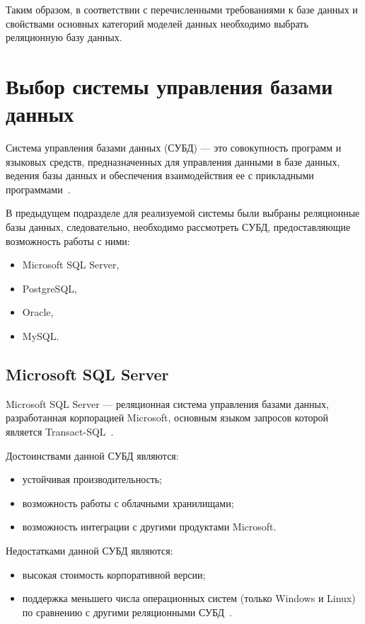 Таким образом, в соответствии с перечисленными требованиями к базе данных и
свойствами основных категорий моделей данных необходимо выбрать реляционную
базу данных.

\section{Выбор системы управления базами данных}

Система управления базами данных (СУБД) --- это совокупность программ и языковых
средств, предназначенных для управления данными в базе данных, ведения базы
данных и обеспечения взаимодействия ее с прикладными программами~\cite{gost01}.

В предыдущем подразделе для реализуемой системы были выбраны реляционные
базы данных, следовательно, необходимо рассмотреть СУБД, предоставляющие
возможность работы с ними:
\begin{itemize}
    \item Microsoft SQL Server,
    \item PostgreSQL,
    \item Oracle,
    \item MySQL.
\end{itemize}

\subsection{Microsoft SQL Server}

Microsoft SQL Server --- реляционная система управления базами данных,
разработанная корпорацией Microsoft, основным языком запросов
которой является Transact-SQL~\cite{art06}.

Достоинствами данной СУБД являются:
\begin{itemize}
    \item устойчивая производительность;
    \item возможность работы с облачными хранилищами;
    \item возможность интеграции с другими продуктами Microsoft.
\end{itemize}

Недостатками данной СУБД являются:
\begin{itemize}
    \item высокая стоимость корпоративной версии;
    \item поддержка меньшего числа операционных систем (только Windows
        и Linux) по сравнению с другими реляционными СУБД~\cite{art07}.
\end{itemize}

